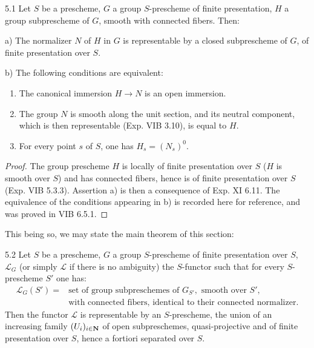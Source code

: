 \begin{proposition}{5.1}\label{XV.5.1}
Let $S$ be a prescheme, $G$ a group $S$-prescheme of finite presentation, $H$ a group subprescheme of $G$, smooth with connected fibers. Then:

\noindent a) The normalizer $N$ of $H$ in $G$ is representable by a closed subprescheme of $G$, of finite presentation over $S$.

\noindent b) The following conditions are equivalent:
\begin{enumerate}[label=\textup{\roman*)}]
\item The canonical immersion $H\to N$ is an open immersion.
\item The group $N$ is smooth along the unit section, and its neutral component, which is then representable (Exp. VIB 3.10), is equal to $H$.
\item For every point $s$ of $S$, one has $H_s=(N_s)^0$.
\end{enumerate}
\end{proposition}
\begin{proof}
The group prescheme $H$ is locally of finite presentation over $S$ ($H$ is smooth over $S$) and has connected fibers, hence is of finite presentation over $S$ (Exp. VIB 5.3.3). Assertion a) is then a consequence of Exp. XI 6.11. The equivalence of the conditions appearing in b) is recorded here for reference, and was proved in VIB 6.5.1.
\end{proof}
This being so, we may state the main theorem of this section:
\begin{theorem}{5.2}\label{XV.5.2}
Let $S$ be a prescheme, $G$ a group $S$-prescheme of finite presentation over $S$, $\mathscr L_G$ (or simply $\mathscr L$ if there is no ambiguity) the $S$-functor such that for every $S$-prescheme $S'$ one has:
\[
\begin{aligned}
\mathscr L_G(S')={}&\text{set of group subpreschemes of }G_{S'},\text{ smooth over }S',\\
&\text{with connected fibers, identical to their connected normalizer.}
\end{aligned}
\]
Then the functor $\mathscr L$ is representable by an $S$-prescheme, the union of an increasing family $(U_i)_{i\in\mathbf{N}}$ of open subpreschemes, quasi-projective and of finite presentation over $S$, hence a fortiori separated over $S$.
\end{theorem}

